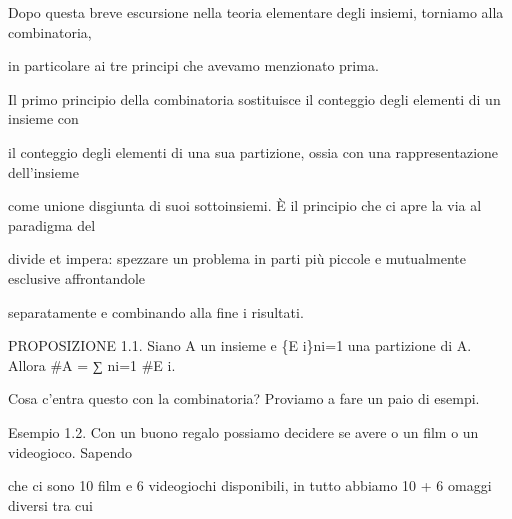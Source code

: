 \documentclass[a4paper,portrait,12pt]{article}
\begin{document}
\begin{flushleft}
Dopo questa breve escursione nella teoria elementare degli insiemi, torniamo alla combinatoria,
\end{flushleft}


\begin{flushleft}
in particolare ai tre principi che avevamo menzionato prima.
\end{flushleft}


\begin{flushleft}
Il primo principio della combinatoria sostituisce il conteggio degli elementi di un insieme con
\end{flushleft}


\begin{flushleft}
il conteggio degli elementi di una sua partizione, ossia con una rappresentazione dell'insieme
\end{flushleft}


\begin{flushleft}
come unione disgiunta di suoi sottoinsiemi. \`{E} il principio che ci apre la via al paradigma del
\end{flushleft}


\begin{flushleft}
divide et impera: spezzare un problema in parti più piccole e mutualmente esclusive affrontandole
\end{flushleft}


\begin{flushleft}
separatamente e combinando alla fine i risultati.
\end{flushleft}


\begin{flushleft}
PROPOSIZIONE 1.1. Siano A un insieme e \{E i\}ni=1 una partizione di A. Allora \#A = ∑ ni=1 \#E i.
\end{flushleft}


\begin{flushleft}
Cosa c'entra questo con la combinatoria? Proviamo a fare un paio di esempi.
\end{flushleft}


\begin{flushleft}
Esempio 1.2. Con un buono regalo possiamo decidere se avere o un film o un videogioco. Sapendo
\end{flushleft}


\begin{flushleft}
che ci sono 10 film e 6 videogiochi disponibili, in tutto abbiamo 10 + 6 omaggi diversi tra cui
\end{flushleft}
\end{document}
